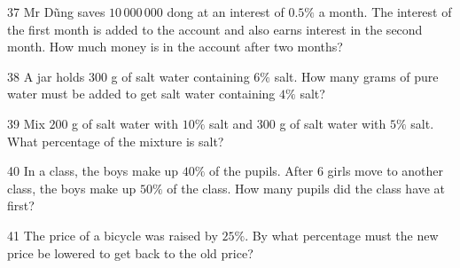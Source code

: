 \gap
\begin{probbox}{37}{}
Mr Dũng saves $10\,000\,000$ dong at an interest of $0.5\%$ a month. The interest of the first month is added to the account and also earns interest in the second month. How much money is in the account after two months?
\end{probbox}
\gap
\begin{probbox}{38}{}
A jar holds $300$ g of salt water containing $6\%$ salt. How many grams of pure water must be added to get salt water containing $4\%$ salt?
\end{probbox}
\gap
\begin{probbox}{39}{}
Mix $200$ g of salt water with $10\%$ salt and $300$ g of salt water with $5\%$ salt. What percentage of the mixture is salt?
\end{probbox}
\gap
\begin{probbox}{40}{}
In a class, the boys make up $40\%$ of the pupils. After $6$ girls move to another class, the boys make up $50\%$ of the class. How many pupils did the class have at first?
\end{probbox}
\gap
\begin{probbox}{41}{}
The price of a bicycle was raised by $25\%$. By what percentage must the new price be lowered to get back to the old price?
\end{probbox}
